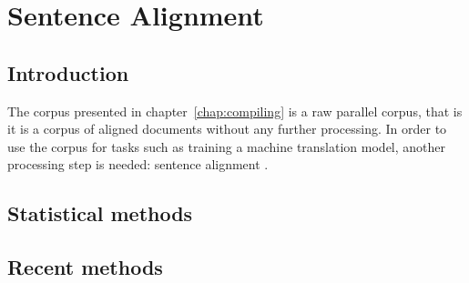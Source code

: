 \chapter{Sentence Alignment}

\section{Introduction}

The corpus presented in chapter~\ref{chap:compiling} is a raw parallel corpus, that is it is a corpus of aligned documents without any further processing. 
In order to use the corpus for tasks such as training a machine translation model, another processing step is needed: sentence alignment \autocite[55]{koehn2009}.



\section{Statistical methods}

\section{Recent methods}